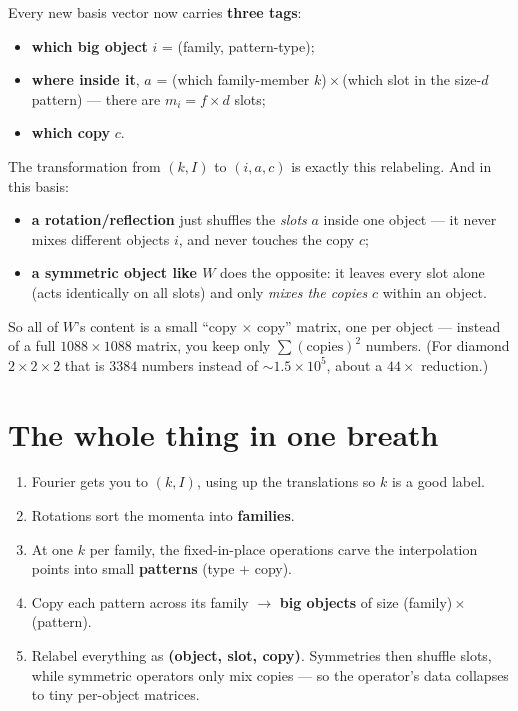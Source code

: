 \documentclass[11pt]{article}
\begin{document}
Every new basis vector now carries \textbf{three tags}:
\begin{itemize}[nosep]
  \item \textbf{which big object} $i$ = (family, pattern-type);
  \item \textbf{where inside it}, $a$ = (which family-member $k$)\,$\times$\,(which slot in the size-$d$
        pattern) --- there are $m_i=f\times d$ slots;
  \item \textbf{which copy} $c$.
\end{itemize}
The transformation from $(k,I)$ to $(i,a,c)$ is exactly this relabeling. And in this basis:
\begin{itemize}[nosep]
  \item \textbf{a rotation/reflection} just shuffles the \emph{slots} $a$ inside one object --- it
        never mixes different objects $i$, and never touches the copy $c$;
  \item \textbf{a symmetric object like $W$} does the opposite: it leaves every slot alone (acts
        identically on all slots) and only \emph{mixes the copies} $c$ within an object.
\end{itemize}
So all of $W$'s content is a small ``copy $\times$ copy'' matrix, one per object --- instead of a full
$1088\times1088$ matrix, you keep only $\sum(\text{copies})^2$ numbers. (For diamond $2\times2\times2$
that is $3384$ numbers instead of $\sim\!1.5\times10^5$, about a $44\times$ reduction.)

\section*{The whole thing in one breath}

\begin{enumerate}[nosep]
  \item Fourier gets you to $(k,I)$, using up the translations so $k$ is a good label.
  \item Rotations sort the momenta into \textbf{families}.
  \item At one $k$ per family, the fixed-in-place operations carve the interpolation points into
        small \textbf{patterns} (type + copy).
  \item Copy each pattern across its family $\to$ \textbf{big objects} of size (family)\,$\times$\,(pattern).
  \item Relabel everything as \textbf{(object, slot, copy)}. Symmetries then shuffle slots, while
        symmetric operators only mix copies --- so the operator's data collapses to tiny per-object
        matrices.
\end{enumerate}
\end{document}
